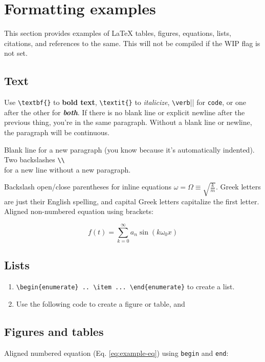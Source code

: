 \section*{Formatting examples}

This section provides examples of \LaTeX{} tables, figures, equations,
lists, citations, and references to the same. This will not be compiled if
the WIP flag is not set.
\subsection*{Text}

Use \verb|\textbf{}| to \textbf{bold text}, \verb|\textit{}| to
\textit{italicize}, \verb|\verb||| for \verb|code|, or one after the other for
\textit{\textbf{both}}.
If there is no blank line or explicit newline after the previous thing, you're
in the same paragraph. Without a blank line or newline, the paragraph will be
continuous.

Blank line for a new paragraph (you know because it's automatically indented).
Two backslashes \verb|\\| \\ for a new line without a new paragraph.

Backslash open/close parentheses for inline equations \(\omega = \Omega \equiv
\sqrt{\frac{k}{m}}\). Greek letters are just their English spelling, and capital
Greek letters capitalize the first letter. Aligned non-numbered equation using
brackets:

\[f(t) = \sum_{k = 0}^{\infty} a_{n} \sin(k\omega_{0}x)\]

\subsection*{Lists}

\begin{enumerate}
    \item \verb|\begin{enumerate} .. \item ... \end{enumerate}| to create a list. \label{list:examples-head}

    \item Use the following code to create a figure or table, and 
\end{enumerate}

\subsection*{Figures and tables}
Aligned numbered equation (Eq. \ref{eq:example-eq}) using \verb|begin| and \verb|end|:

